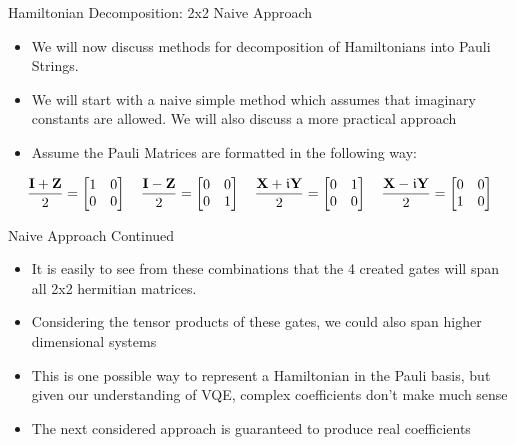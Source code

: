 \begin{frame}{Hamiltonian Decomposition: 2x2 Naive Approach}
    \begin{itemize}
        \item We will now discuss methods for decomposition of Hamiltonians into Pauli Strings.
        \item We will start with a naive simple method which assumes that imaginary constants are allowed. We will also discuss a more practical approach
        \item Assume the Pauli Matrices are formatted in the following way:
    \end{itemize}
    \[
    \frac{\mbox{\bfseries{\textrm{I}}} + \mbox{\bfseries{\textrm{Z}}}}{2} = \begin{bmatrix}
    1 & 0 \\
    0 & 0 \\
    \end{bmatrix} \quad
    \frac{\mbox{\bfseries{\textrm{I}}} - \mbox{\bfseries{\textrm{Z}}}}{2} = \begin{bmatrix}
    0 & 0 \\
    0 & 1 \\
    \end{bmatrix} \quad
    \frac{\mbox{\bfseries{\textrm{X}}} + \kern 0.5pt\mathfrak{i} \mbox{\bfseries{\textrm{Y}}}}{2} = \begin{bmatrix}
    0 & 1 \\
    0 & 0 \\
    \end{bmatrix} \quad
    \frac{\mbox{\bfseries{\textrm{X}}} - \kern 0.5pt\mathfrak{i} \mbox{\bfseries{\textrm{Y}}}}{2} = \begin{bmatrix}
    0 & 0 \\
    1 & 0 \\
    \end{bmatrix}
    \]    
\end{frame}

\begin{frame}{Naive Approach Continued}
\begin{itemize}
    \item It is easily to see from these combinations that the 4 created gates will span all 2x2 hermitian matrices. 
    \item Considering the tensor products of these gates, we could also span higher dimensional systems
    \item This is one possible way to represent a Hamiltonian in the Pauli basis, but given our understanding of VQE, complex coefficients don't make much sense
    \item The next considered approach is guaranteed to produce real coefficients
    
\end{itemize}
    
\end{frame}

